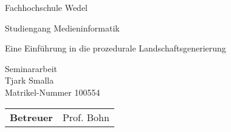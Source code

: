 
\pagestyle{empty} %

\clearscrheadings\clearscrplain
\begin{center}
\begin{Huge}
Fachhochschule Wedel\\
\vspace{3mm}
\end{Huge}
{\Large Studiengang Medieninformatik}\\

\vspace{20mm}
\begin{Large}
Eine Einführung in die prozedurale Landschaftsgenerierung\\
\end{Large}
\vspace{8mm}
Seminararbeit\\
\vspace{0.4cm}
\vspace{2 cm}
Tjark Smalla \\
Matrikel-Nummer 100554\\
\vspace{8cm}
\begin{tabular}{rl}
{\bfseries Betreuer} & Prof. Bohn\\
\end{tabular}

\end{center}
\clearpage


\pagestyle{useheadings} %

\tableofcontents %
\listoffigures %
















